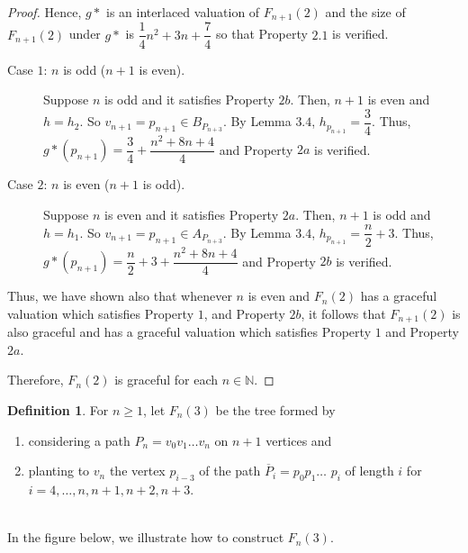 \documentclass[12pt]{report}
\theoremstyle{definition}
\newtheorem{define}{\indent Definition}[chapter]
\def\indent{\hspace*{.5cm}}
\begin{document}
\begin{proof}
    \indent Hence, $g\ast$ is an interlaced valuation of $F_{n+1}(2)$ and the size of $F_{n+1}(2)$ under $g\ast$ is $\dfrac{1}{4}n^2+3n+\dfrac{7}{4}$ so that Property $2.1$ is verified.
    
    \begin{description}
        \item[Case $1$: $n$ is odd ($n+1$ is even).] 
        
        Suppose $n$ is odd and it satisfies Property $2b$. Then, $n+1$ is even and $h=h_{2}$. So $v_{n+1}=p_{n+1}\in B_{P_{n+3}}$. By Lemma $3.4$, $h_{p_{n+1}}=\dfrac{3}{4}$. Thus, $g\ast(p_{n+1})=\dfrac{3}{4}+\dfrac{n^2+8n+4}{4}$ and Property $2a$ is verified.
        
        \item[Case $2$: $n$ is even ($n+1$ is odd).]
        
        Suppose $n$ is even and it satisfies Property $2a$. Then, $n+1$ is odd and $h=h_{1}$. So $v_{n+1}=p_{n+1}\in A_{P_{n+3}}$. By Lemma $3.4$, $h_{p_{n+1}}=\dfrac{n}{2}+3$. Thus, $g\ast(p_{n+1})=\dfrac{n}{2}+3+\dfrac{n^2+8n+4}{4}$ and Property $2b$ is verified.
    \end{description}

    \indent Thus, we have shown also that whenever $n$ is even and $F_{n}(2)$ has a graceful valuation which satisfies Property $1$, and Property $2b$, it follows that $F_{n+1}(2)$ is also graceful and has a graceful valuation which satisfies Property $1$ and Property $2a$.
    
    \indent Therefore, $F_{n}(2)$ is graceful for each $n\in\mathbb{N}$.
\end{proof}

\newpage
\begin{define}
    For $n\geq1$, let  $F_{n}\left ( 3 \right )$ be the tree formed by \begin{enumerate}
    	\item considering a path  $P_{n}=v_{0}v_{1}$$\ldots$$v_{n}$ on $n+1$ vertices and
    	\item planting to $v_{n}$ the vertex $p_{i-3}$ of the path $\overline{P}_{i}=p_{0}p_{1}\ldots$ $p_{i}$ of length $i$ for $i=4,\ldots,n,n+1,n+2,n+3$.
    
	\end{enumerate}
\end{define}\\

In the figure below, we illustrate how to construct $F_{n}(3)$.
\end{document}
